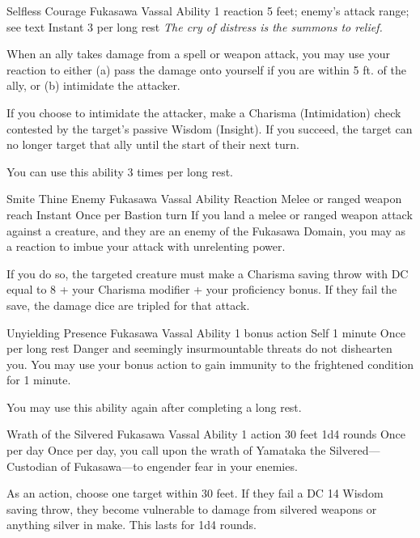 \ability%
    {Selfless Courage}
    {Fukasawa Vassal Ability}
    {1 reaction}
    {5 feet; enemy's attack range; see text}
    {Instant}
    {3 per long rest}
\textit{The cry of distress is the summons to relief.}

When an ally takes damage from a spell or weapon attack,
you may use your reaction to either
(a) pass the damage onto yourself if you are within 5 ft.
of the ally,
or (b) intimidate the attacker.

If you choose to intimidate the attacker,
make a Charisma (Intimidation) check
contested by the target's passive Wisdom (Insight).
If you succeed,
the target can no longer target that ally
until the start of their next turn.

You can use this ability 3 times per long rest.


\ability%
    {Smite Thine Enemy}
    {Fukasawa Vassal Ability}
    {Reaction}
    {Melee or ranged weapon reach}
    {Instant}
    {Once per Bastion turn}
If you land a melee or ranged weapon attack against a creature,
and they are an enemy of the Fukasawa Domain,
you may as a reaction to imbue your attack with unrelenting power.

If you do so,
the targeted creature must make a Charisma saving throw
with DC equal to 8 + your Charisma modifier
+ your proficiency bonus.
If they fail the save,
the damage dice are tripled for that attack.

\ability%
    {Unyielding Presence}
    {Fukasawa Vassal Ability}
    {1 bonus action}
    {Self}
    {1 minute}
    {Once per long rest}
Danger and seemingly insurmountable threats
do not dishearten you.
You may use your bonus action to gain immunity
to the frightened condition for 1 minute.

You may use this ability again after completing a long rest.


\ability%
    {Wrath of the Silvered}
    {Fukasawa Vassal Ability}
    {1 action}
    {30 feet}
    {1d4 rounds}
    {Once per day}
Once per day,
you call upon the wrath of Yamataka the Silvered---Custodian
of Fukasawa---to engender fear in your enemies.

As an action,
choose one target within 30 feet.
If they fail a DC 14 Wisdom saving throw,
they become vulnerable to damage from silvered weapons
or anything silver in make.
This lasts for 1d4 rounds.



